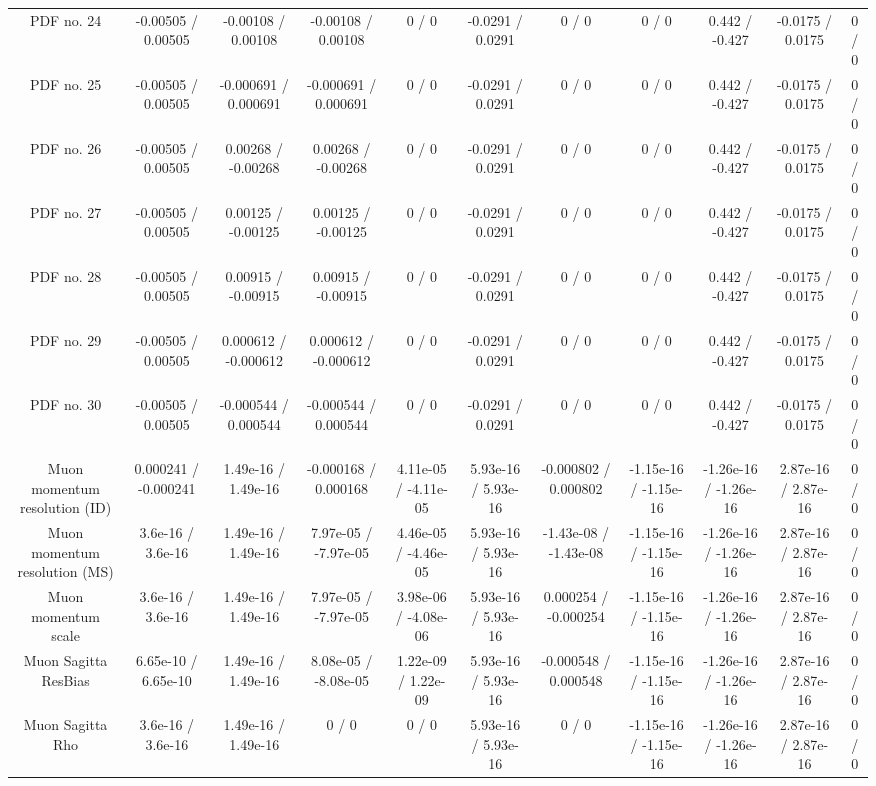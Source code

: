 \begin{table}[htbp]
\begin{center}
\begin{tabular}{|c|c|c|c|c|c|c|c|c|c|c|}
  PDF no. 24 & -0.00505 / 0.00505 & -0.00108 / 0.00108 & -0.00108 / 0.00108 & 0 / 0 & -0.0291 / 0.0291 & 0 / 0 & 0 / 0 & 0.442 / -0.427 & -0.0175 / 0.0175 & 0 / 0 \\ 
  PDF no. 25 & -0.00505 / 0.00505 & -0.000691 / 0.000691 & -0.000691 / 0.000691 & 0 / 0 & -0.0291 / 0.0291 & 0 / 0 & 0 / 0 & 0.442 / -0.427 & -0.0175 / 0.0175 & 0 / 0 \\ 
  PDF no. 26 & -0.00505 / 0.00505 & 0.00268 / -0.00268 & 0.00268 / -0.00268 & 0 / 0 & -0.0291 / 0.0291 & 0 / 0 & 0 / 0 & 0.442 / -0.427 & -0.0175 / 0.0175 & 0 / 0 \\ 
  PDF no. 27 & -0.00505 / 0.00505 & 0.00125 / -0.00125 & 0.00125 / -0.00125 & 0 / 0 & -0.0291 / 0.0291 & 0 / 0 & 0 / 0 & 0.442 / -0.427 & -0.0175 / 0.0175 & 0 / 0 \\ 
  PDF no. 28 & -0.00505 / 0.00505 & 0.00915 / -0.00915 & 0.00915 / -0.00915 & 0 / 0 & -0.0291 / 0.0291 & 0 / 0 & 0 / 0 & 0.442 / -0.427 & -0.0175 / 0.0175 & 0 / 0 \\ 
  PDF no. 29 & -0.00505 / 0.00505 & 0.000612 / -0.000612 & 0.000612 / -0.000612 & 0 / 0 & -0.0291 / 0.0291 & 0 / 0 & 0 / 0 & 0.442 / -0.427 & -0.0175 / 0.0175 & 0 / 0 \\ 
  PDF no. 30 & -0.00505 / 0.00505 & -0.000544 / 0.000544 & -0.000544 / 0.000544 & 0 / 0 & -0.0291 / 0.0291 & 0 / 0 & 0 / 0 & 0.442 / -0.427 & -0.0175 / 0.0175 & 0 / 0 \\ 
  Muon momentum resolution (ID) & 0.000241 / -0.000241 & 1.49e-16 / 1.49e-16 & -0.000168 / 0.000168 & 4.11e-05 / -4.11e-05 & 5.93e-16 / 5.93e-16 & -0.000802 / 0.000802 & -1.15e-16 / -1.15e-16 & -1.26e-16 / -1.26e-16 & 2.87e-16 / 2.87e-16 & 0 / 0 \\ 
  Muon momentum resolution (MS) & 3.6e-16 / 3.6e-16 & 1.49e-16 / 1.49e-16 & 7.97e-05 / -7.97e-05 & 4.46e-05 / -4.46e-05 & 5.93e-16 / 5.93e-16 & -1.43e-08 / -1.43e-08 & -1.15e-16 / -1.15e-16 & -1.26e-16 / -1.26e-16 & 2.87e-16 / 2.87e-16 & 0 / 0 \\ 
  Muon momentum scale & 3.6e-16 / 3.6e-16 & 1.49e-16 / 1.49e-16 & 7.97e-05 / -7.97e-05 & 3.98e-06 / -4.08e-06 & 5.93e-16 / 5.93e-16 & 0.000254 / -0.000254 & -1.15e-16 / -1.15e-16 & -1.26e-16 / -1.26e-16 & 2.87e-16 / 2.87e-16 & 0 / 0 \\ 
  Muon Sagitta ResBias & 6.65e-10 / 6.65e-10 & 1.49e-16 / 1.49e-16 & 8.08e-05 / -8.08e-05 & 1.22e-09 / 1.22e-09 & 5.93e-16 / 5.93e-16 & -0.000548 / 0.000548 & -1.15e-16 / -1.15e-16 & -1.26e-16 / -1.26e-16 & 2.87e-16 / 2.87e-16 & 0 / 0 \\ 
  Muon Sagitta Rho & 3.6e-16 / 3.6e-16 & 1.49e-16 / 1.49e-16 & 0 / 0 & 0 / 0 & 5.93e-16 / 5.93e-16 & 0 / 0 & -1.15e-16 / -1.15e-16 & -1.26e-16 / -1.26e-16 & 2.87e-16 / 2.87e-16 & 0 / 0 \\ 

\end{tabular}
\end{center}
\end{table}
